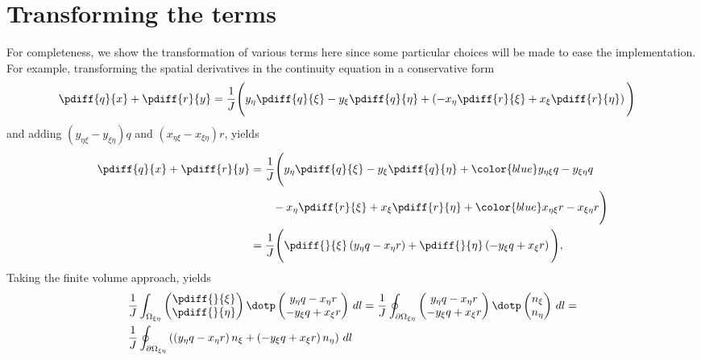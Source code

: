 \section{Transforming the terms}
For completeness, we show the transformation of various terms here since some particular choices will be made to ease the implementation.
For example, transforming the spatial derivatives in the continuity equation in a conservative form
%
\begin{align}
	\pdiff{q}{x} + \pdiff{r}{y}  & = \frac{1}{J} \Bigg(  y_{\eta} \pdiff{q}{\xi}
    -y_{\xi}\pdiff{q}{\eta} +\left( - x_{\eta}\pdiff{r}{\xi}
    +x_{\xi}\pdiff{r}{\eta} \right) \Bigg)
\end{align}
and adding $(y_{\eta\xi} - y_{\xi\eta})q$ and $(x_{\eta\xi} - x_{\xi\eta})r$, yields
\begin{align}
    \pdiff{q}{x} + \pdiff{r}{y}
    & = \frac{1}{J} \Bigg(
    y_{\eta} \pdiff{q}{\xi}- y_{\xi}\pdiff{q}{\eta} + {\color{blue}y_{\eta\xi}q - y_{\xi\eta}q}
    \\
    & \qquad - x_{\eta}\pdiff{r}{\xi} + x_{\xi}\pdiff{r}{\eta} +{\color{blue}x_{\eta\xi}r - x_{\xi\eta}r} \Bigg)
    \\
    & =\frac{1}{J}\Bigg( \pdiff{}{\xi} \left( y_{\eta} q - x_{\eta} r \right) + \pdiff{}{\eta} \left( -y_{\xi} q + x_{\xi} r \right)\Bigg),
\end{align}
%
Taking the finite volume approach, yields
\begin{align}
&\frac{1}{J}\int_{\Omega_{\xi\eta}}
\begin{pmatrix}
    \pdiff{}{\xi} \\ \pdiff{}{\eta}
\end{pmatrix}
\dotp
\begin{pmatrix}
    y_{\eta} q - x_{\eta} r \\ -y_{\xi} q + x_{\xi} r
\end{pmatrix}
\, dl
=
\frac{1}{J}\oint_{\partial\Omega_{\xi\eta}}
\begin{pmatrix}
    y_{\eta} q - x_{\eta} r \\ -y_{\xi} q + x_{\xi} r
\end{pmatrix}
\dotp
\begin{pmatrix}
    n_\xi \\ n_\eta
\end{pmatrix}
\, dl =
\\
&
\frac{1}{J}\oint_{\partial\Omega_{\xi\eta}} \left( \left( y_{\eta} q - x_{\eta} r \right)n_\xi + \left( -y_{\xi} q + x_{\xi} r \right) n_\eta \right)\, dl
\label{eq:transformed_mass_flux}
\end{align}
%
